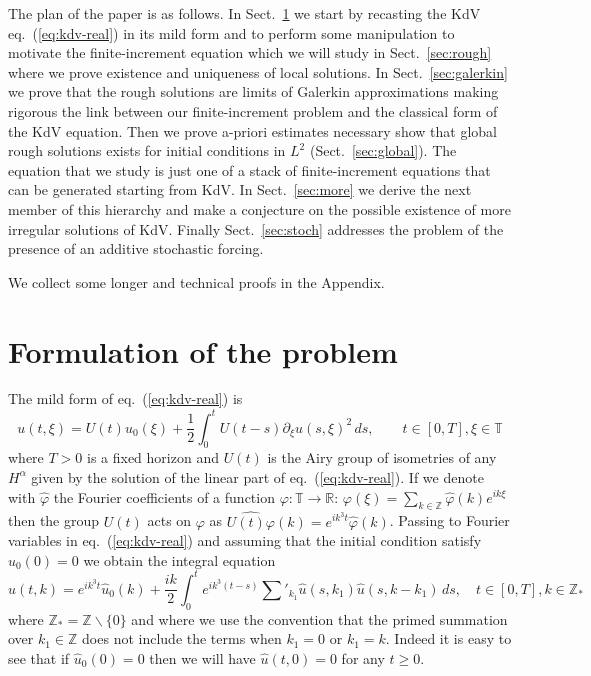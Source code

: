 \documentclass[a4paper,11pt,reqno]{article}
\newcommand{\RR}{\mathbb{R}}
\newcommand{\TT}{\mathbb{T}}
\newcommand{\ZZ}{\mathbb{Z}}
\newcommand{\wh}{\widehat}
\begin{document}
\bigskip
The plan of the paper is as follows. In Sect.~\ref{sec:intro} we start by recasting the KdV
eq.~(\ref{eq:kdv-real}) in its mild form and to perform some
manipulation to motivate the finite-increment equation which we will study
in Sect.~\ref{sec:rough}  where we prove  existence and uniqueness of local solutions. In
Sect.~\ref{sec:galerkin} we  prove that the rough solutions are
limits of Galerkin approximations making rigorous the link between our
finite-increment problem and the classical form of the KdV equation.
Then we prove a-priori estimates necessary
show that global rough solutions
exists for initial conditions in $L^2$ (Sect.~\ref{sec:global}). The
equation that we study is just one of a stack of finite-increment equations that can be
generated starting from KdV. In Sect.~\ref{sec:more} we derive the
next member of this hierarchy and make a conjecture on  the possible
existence of more irregular solutions of KdV. Finally
Sect.~\ref{sec:stoch} addresses the problem of the presence of an
additive stochastic forcing.

We collect some longer and technical proofs in the Appendix.

\bigskip

\section{Formulation of the problem}
\label{sec:intro}
The mild form of eq.~(\ref{eq:kdv-real})  is
\begin{equation}
\label{eq:kdv-mild}
u(t,\xi) = U(t) u_0(\xi) + \frac{1}{2} \int_0^t U(t-s) \partial_\xi
u(s,\xi)^2\, ds ,\qquad t \in[0,T], \xi \in \TT  
\end{equation}
where $T>0$ is a fixed horizon and  $U(t)$ is the Airy group of isometries of any $H^\alpha$ given by the
solution of the linear part of eq.~(\ref{eq:kdv-real}). If we denote with
$\wh \varphi$ the Fourier coefficients of a function $\varphi : \TT \to
\RR$:
$
\varphi(\xi) = \sum_{k \in \ZZ} \wh \varphi(k) e^{i k \xi}
$
then the group $U(t)$ acts on $\varphi$ as
$
\wh{U(t) \varphi}(k) = e^{i k^3 t} \wh \varphi(k)
$.
Passing to Fourier variables in eq.~(\ref{eq:kdv-real}) and assuming
that the initial condition satisfy $\wh u_0(0) = 0$ we obtain the
integral equation
\begin{equation}
  \label{eq:kdv-spectral}
\wh u(t,k) = e^{i k^3 t} \wh u_0(k) + \frac{ik}2 \int_0^t e^{i k^3 (t-s)}
\sum'_{k_1} \wh u(s,k_1) \wh u(s,k-k_1) \, ds, \quad t \in [0,T], k \in \ZZ_* 
\end{equation}
where $\ZZ_* = \ZZ \backslash \{ 0 \} $ and where we use the
convention that the primed summation over $k_1 \in \ZZ$ does not include the
terms when $k_1 = 0$ or $k_1 = k$. Indeed it is easy to see that if
$\wh u_0(0) = 0$ then we will have $\wh u(t,0) = 0$ for any $t \ge 0$.
\end{document}
